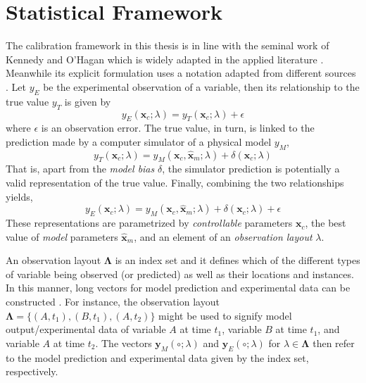 \section{Statistical Framework}\label{sec:bc_statistical_framework}

The calibration framework in this thesis is in line with the seminal work of Kennedy and O'Hagan \cite{Kennedy2001} which is widely adapted in the applied literature \cite{Bayarri2007,Higdon2008,Arendt2012,Reichert2012}.
Meanwhile its explicit formulation uses a notation adapted from different sources \cite{Kennedy2001,Santner2003,Reichert2012}.
Let $y_E$ be the experimental observation of a variable,
then its relationship to the true value $y_T$ is given by
\begin{equation}
    y_E(\bm{x}_c; \lambda) = y_T (\bm{x}_c; \lambda) + \epsilon
\label{eq:bc_observation_true}
\end{equation}
where $\epsilon$ is an observation error.
The true value, in turn, is linked to the prediction made by a computer simulator of a physical model $y_M$,
\begin{equation}
    y_T(\bm{x}_c; \lambda) = y_M (\bm{x}_c, \hat{\bm{x}}_m; \lambda) + \delta (\bm{x}_c; \lambda)
\label{eq:bc_true_simulation}
\end{equation}
That is, apart from the \emph{model bias} $\delta$, the simulator prediction is potentially a valid representation of the true value.
Finally, combining the two relationships yields,
\begin{equation}
    y_E(\bm{x}_c; \lambda) = y_M (\bm{x}_c, \hat{\bm{x}}_m; \lambda) + \delta (\bm{x}_c; \lambda) + \epsilon
\label{eq:bc_observation_true}
\end{equation}
These representations are parametrized by \emph{controllable} parameters $\bm{x}_c$,
the best value of \emph{model} parameters $\hat{\bm{x}}_m$, and an element of an \emph{observation layout} $\lambda$.

An observation layout $\boldsymbol{\Lambda}$ is an index set and it defines which of the different types of variable being observed (or predicted) as well as their locations and instances.
In this manner, long vectors for model prediction and experimental data can be constructed \cite{Reichert2012}.
For instance, the observation layout $\boldsymbol{\Lambda} = \{(A,t_1), (B,t_1), (A, t_2)\}$ might be used to signify model output/experimental data of variable $A$ at time $t_1$, variable $B$ at time $t_1$, and variable $A$ at time $t_2$.
The vectors $\bm{y}_M(\circ;\lambda)$ and $\bm{y}_E(\circ;\lambda)$ for $\lambda \in \boldsymbol{\Lambda}$ then refer to the model prediction and experimental data given by the index set, respectively.

